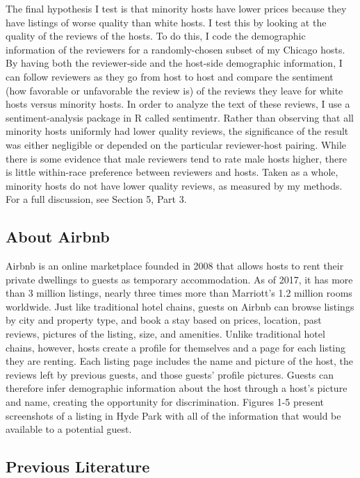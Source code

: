 \documentclass[11pt, oneside]{article}
\begin{document}
The final hypothesis I test is that minority hosts have lower prices because they have listings of worse quality than white hosts. I test this by looking at the quality of the reviews of the hosts. To do this, I code the demographic information of the reviewers for a randomly-chosen subset of my Chicago hosts. By having both the reviewer-side and the host-side demographic information, I can follow reviewers as they go from host to host and compare the sentiment (how favorable or unfavorable the review is) of the reviews they leave for white hosts versus minority hosts. In order to analyze the text of these reviews, I use a sentiment-analysis package in R called sentimentr.\cite{sentimentr} Rather than observing that all minority hosts uniformly had lower quality reviews, the significance of the result was either negligible or depended on the particular reviewer-host pairing. While there is some evidence that male reviewers tend to rate male hosts higher, there is little within-race preference between reviewers and hosts. Taken as a whole, minority hosts do not have lower quality reviews, as measured by my methods. For a full discussion, see Section 5, Part 3. 






\subsection{About Airbnb} %
Airbnb is an online marketplace founded in 2008 that allows hosts to rent their private dwellings to guests as temporary accommodation. As of 2017, it has more than 3 million listings, nearly three times more than Marriott's 1.2 million rooms worldwide.\cite{aboutus} Just like traditional hotel chains, guests on Airbnb can browse listings by city and property type, and book a stay based on prices, location, past reviews, pictures of the listing, size, and amenities. Unlike traditional hotel chains, however, hosts create a profile for themselves and a page for each listing they are renting. Each listing page includes the name and picture of the host, the reviews left by previous guests, and those guests' profile pictures. Guests can therefore infer demographic information about the host through a host's picture and name, creating the opportunity for discrimination. Figures 1-5 present screenshots of a listing in Hyde Park with all of the information that would be available to a potential guest. 


\subsection{Previous Literature} %
\end{document}

